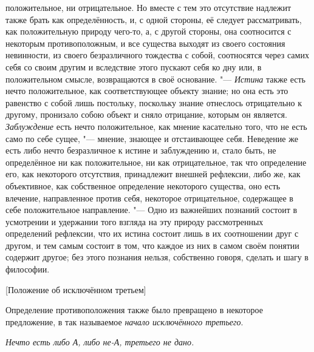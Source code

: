положительное, ни отрицательное. Но вместе с тем это отсутствие надлежит
также брать как определённость, и, с одной стороны, её следует
рассматривать, как положительную природу чего-то, а, с другой стороны, она
соотносится с некоторым противоположным, и все существа выходят из своего
состояния невинности, из своего безразличного тождества с собой,
соотносятся через самих себя со своим другим и вследствие этого пускают
себя ко дну или, в положительном смысле, возвращаются в своё
основание. "--- {\em Истина} также есть нечто положительное, как
соответствующее объекту знание; но она есть это равенство с собой лишь
постольку, поскольку знание отнеслось отрицательно к другому, пронизало
собою объект и сняло отрицание, которым он является.
{\em Заблуждение} есть нечто положительное, как мнение
касательно того, что не есть само по себе сущее, "--- мнение, знающее и
отстаивающее себя. Неведение же есть либо нечто безразличное к истине и
заблуждению и, стало быть, не определённое ни как положительное, ни как
отрицательное, так что определение его, как некоторого отсутствия,
принадлежит внешней рефлексии, либо же, как объективное, как собственное
определение некоторого существа, оно есть влечение, направленное против
себя, некоторое отрицательное, содержащее в себе положительное направление.
"--- Одно из важнейших познаний состоит в усмотрении и удержании того взгляда
на эту природу рассмотренных определений рефлексии, что их истина состоит
лишь в их соотношении друг с другом, и тем самым состоит в том, что каждое
из них в самом своём понятии содержит другое; без этого познания нельзя,
собственно говоря, сделать и шагу в философии.

%
  {[Положение об исключённом третьем]}

Определение противоположения также было превращено в некоторое предложение,
в так называемое {\em начало исключённого третьего}.

{\em Нечто есть либо А, либо не-А, третьего не дано.}

